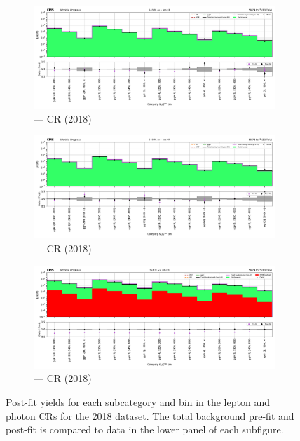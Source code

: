 \begin{figure}[htbp]
    \begin{subfigure}[b]{0.49\textwidth}
        \includegraphics[width=\textwidth]{chapters/higgstoinv/figures/mountain_ranges/2018/ggF/Zmumu_tree_fit_s-abs_values_ggF_cats.pdf}
        \caption{\ggH --- \doubleMuCr \gls{CR} (2018)}
    \end{subfigure}
    \hfill
    \begin{subfigure}[b]{0.49\textwidth}
        \includegraphics[width=\textwidth]{chapters/higgstoinv/figures/mountain_ranges/2018/ggF/Zee_tree_fit_s-abs_values_ggF_cats.pdf}
        \caption{\ggH --- \doubleEleCr \gls{CR} (2018)}
    \end{subfigure}

    \begin{subfigure}[b]{0.49\textwidth}
        \includegraphics[width=\textwidth]{chapters/higgstoinv/figures/mountain_ranges/2018/ggF/Photon_tree_fit_s-abs_values_ggF_cats.pdf}
        \caption{\ggH --- \singlePhotonCr \gls{CR} (2018)}
    \end{subfigure}
    \caption[Post-fit yields for each \ggH subcategory and \ptmiss bin in the lepton and photon control regions for the 2018 dataset]{Post-fit yields for each \ggH subcategory and \ptmiss bin in the lepton and photon \glspl{CR} for the 2018 dataset. The total background pre-fit and post-fit is compared to data in the lower panel of each subfigure.}
    \label{fig:htoinv_mountain_range_ggF_2018_CRs}
\end{figure}
